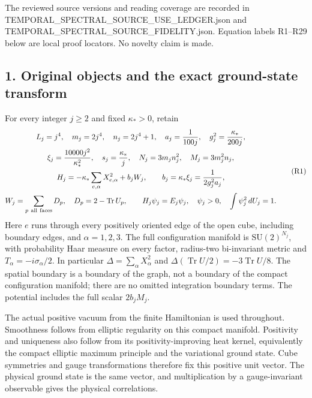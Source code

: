 \documentclass[11pt]{article}
\begin{document}
The reviewed source versions and reading coverage are recorded in
TEMPORAL\_SPECTRAL\_SOURCE\_USE\_LEDGER.json and TEMPORAL\_SPECTRAL\_SOURCE\_FIDELITY.json. Equation labels R1–R29
below are local proof locators. No novelty claim is made.

\subsection*{1. Original objects and the exact ground-state transform}

For every integer \(j\ge2\) and fixed \(\kappa_*>0\), retain
\[
\begin{gathered}
 L_j=j^4,\quad m_j=2j^4,\quad n_j=2j^4+1,\quad
 a_j={1\over100j},\quad g_j^2={\kappa_*\over200j},\\
 \xi_j={10000j^2\over\kappa_*^2},\quad s_j={\kappa_*\over j},\quad
 N_j=3m_jn_j^2,\quad M_j=3m_j^2n_j,\\
 H_j=-\kappa_*\sum_{e,\alpha}X_{e,\alpha}^2+
       b_j W_j,\qquad b_j=\kappa_*\xi_j={1\over2g_j^2a_j},\\
 W_j=\sum_{p\ {\rm all\ faces}}D_p,\quad
 D_p=2-\operatorname{Tr}U_p,\qquad
 H_j\psi_j=E_j\psi_j,\quad\psi_j>0,\quad
 \int\psi_j^2\,dU_j=1.
\end{gathered}\tag{R1}
\]
Here \(e\) runs through every positively oriented edge of the open cube,
including boundary edges, and \(\alpha=1,2,3\).
The full configuration manifold is \(\mathrm{SU}(2)^{N_j}\), with
probability Haar measure on every factor, radius-two bi-invariant metric
and \(T_\alpha=-i\sigma_\alpha/2\). In particular
\(\Delta=\sum_\alpha X_\alpha^2\) and
\(\Delta(\operatorname{Tr}U/2)=-3\operatorname{Tr}U/8\).
The spatial boundary is a boundary of the graph, not a boundary of the
compact configuration manifold; there are no omitted integration boundary
terms. The potential includes the full scalar \(2b_jM_j\).

The actual positive vacuum from the finite Hamiltonian is used throughout.
Smoothness follows from elliptic regularity on this compact manifold.
Positivity and uniqueness also follow from its positivity-improving heat
kernel, equivalently the compact elliptic maximum principle and the
variational ground state. Cube symmetries and gauge transformations
therefore fix this positive unit vector. The physical ground state is
the same vector, and multiplication by a gauge-invariant observable gives
the physical correlations.
\end{document}
